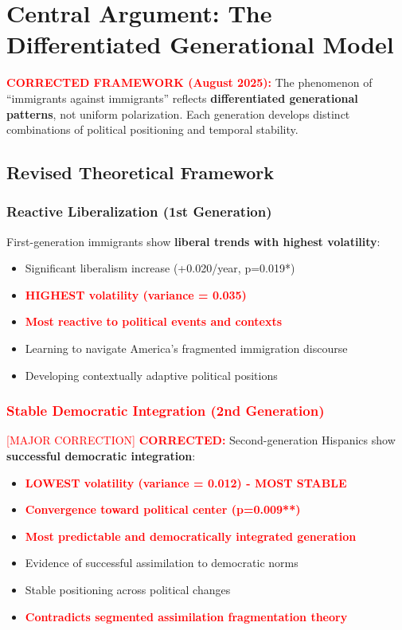 
\section{Central Argument: The Differentiated Generational Model}

\textcolor{red}{\textbf{CORRECTED FRAMEWORK (August 2025):}} The phenomenon of ``immigrants against immigrants'' reflects \textbf{differentiated generational patterns}, not uniform polarization. Each generation develops distinct combinations of political positioning and temporal stability.

\subsection{Revised Theoretical Framework}

\subsubsection{Reactive Liberalization (1st Generation)}
First-generation immigrants show \textbf{liberal trends with highest volatility}:
\begin{itemize}
    \item Significant liberalism increase (+0.020/year, p=0.019*)
    \item \textcolor{red}{\textbf{HIGHEST volatility (variance = 0.035)}}
    \item \textcolor{red}{\textbf{Most reactive to political events and contexts}}
    \item Learning to navigate America's fragmented immigration discourse
    \item Developing contextually adaptive political positions
\end{itemize}

\subsubsection{\textcolor{red}{Stable Democratic Integration (2nd Generation)}} \textcolor{red}{[MAJOR CORRECTION]}
\textcolor{red}{\textbf{CORRECTED:}} Second-generation Hispanics show \textbf{successful democratic integration}:
\begin{itemize}
    \item \textcolor{red}{\textbf{LOWEST volatility (variance = 0.012) - MOST STABLE}}
    \item \textcolor{red}{\textbf{Convergence toward political center (p=0.009**)}}
    \item \textcolor{red}{\textbf{Most predictable and democratically integrated generation}}
    \item Evidence of successful assimilation to democratic norms
    \item Stable positioning across political changes
    \item \textcolor{red}{\textbf{Contradicts segmented assimilation fragmentation theory}}
\end{itemize}

